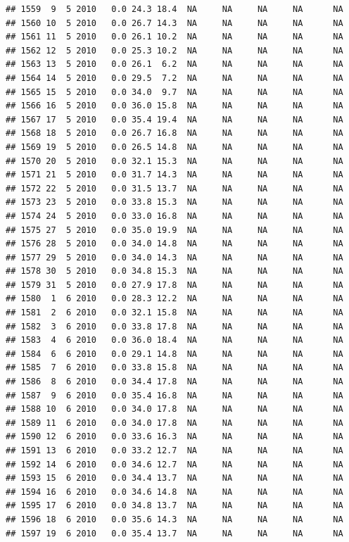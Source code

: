 \documentclass[
]{book}
\begin{document}
\begin{verbatim}
## 1559  9  5 2010   0.0 24.3 18.4  NA     NA     NA     NA      NA
## 1560 10  5 2010   0.0 26.7 14.3  NA     NA     NA     NA      NA
## 1561 11  5 2010   0.0 26.1 10.2  NA     NA     NA     NA      NA
## 1562 12  5 2010   0.0 25.3 10.2  NA     NA     NA     NA      NA
## 1563 13  5 2010   0.0 26.1  6.2  NA     NA     NA     NA      NA
## 1564 14  5 2010   0.0 29.5  7.2  NA     NA     NA     NA      NA
## 1565 15  5 2010   0.0 34.0  9.7  NA     NA     NA     NA      NA
## 1566 16  5 2010   0.0 36.0 15.8  NA     NA     NA     NA      NA
## 1567 17  5 2010   0.0 35.4 19.4  NA     NA     NA     NA      NA
## 1568 18  5 2010   0.0 26.7 16.8  NA     NA     NA     NA      NA
## 1569 19  5 2010   0.0 26.5 14.8  NA     NA     NA     NA      NA
## 1570 20  5 2010   0.0 32.1 15.3  NA     NA     NA     NA      NA
## 1571 21  5 2010   0.0 31.7 14.3  NA     NA     NA     NA      NA
## 1572 22  5 2010   0.0 31.5 13.7  NA     NA     NA     NA      NA
## 1573 23  5 2010   0.0 33.8 15.3  NA     NA     NA     NA      NA
## 1574 24  5 2010   0.0 33.0 16.8  NA     NA     NA     NA      NA
## 1575 27  5 2010   0.0 35.0 19.9  NA     NA     NA     NA      NA
## 1576 28  5 2010   0.0 34.0 14.8  NA     NA     NA     NA      NA
## 1577 29  5 2010   0.0 34.0 14.3  NA     NA     NA     NA      NA
## 1578 30  5 2010   0.0 34.8 15.3  NA     NA     NA     NA      NA
## 1579 31  5 2010   0.0 27.9 17.8  NA     NA     NA     NA      NA
## 1580  1  6 2010   0.0 28.3 12.2  NA     NA     NA     NA      NA
## 1581  2  6 2010   0.0 32.1 15.8  NA     NA     NA     NA      NA
## 1582  3  6 2010   0.0 33.8 17.8  NA     NA     NA     NA      NA
## 1583  4  6 2010   0.0 36.0 18.4  NA     NA     NA     NA      NA
## 1584  6  6 2010   0.0 29.1 14.8  NA     NA     NA     NA      NA
## 1585  7  6 2010   0.0 33.8 15.8  NA     NA     NA     NA      NA
## 1586  8  6 2010   0.0 34.4 17.8  NA     NA     NA     NA      NA
## 1587  9  6 2010   0.0 35.4 16.8  NA     NA     NA     NA      NA
## 1588 10  6 2010   0.0 34.0 17.8  NA     NA     NA     NA      NA
## 1589 11  6 2010   0.0 34.0 17.8  NA     NA     NA     NA      NA
## 1590 12  6 2010   0.0 33.6 16.3  NA     NA     NA     NA      NA
## 1591 13  6 2010   0.0 33.2 12.7  NA     NA     NA     NA      NA
## 1592 14  6 2010   0.0 34.6 12.7  NA     NA     NA     NA      NA
## 1593 15  6 2010   0.0 34.4 13.7  NA     NA     NA     NA      NA
## 1594 16  6 2010   0.0 34.6 14.8  NA     NA     NA     NA      NA
## 1595 17  6 2010   0.0 34.8 13.7  NA     NA     NA     NA      NA
## 1596 18  6 2010   0.0 35.6 14.3  NA     NA     NA     NA      NA
## 1597 19  6 2010   0.0 35.4 13.7  NA     NA     NA     NA      NA

\end{verbatim}
\end{document}
